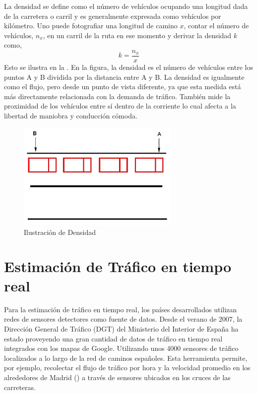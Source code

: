 La densidad se define como el número de vehículos ocupando una longitud dada de la carretera o carril y es generalmente expresada como vehículos por kilómetro. Uno puede fotografiar una longitud de camino $x$, contar el número de vehículos, $n_{x}$, en un carril de la ruta en ese momento y derivar la densidad $k$ como,
\begin{equation}
k=\frac { { n }_{ x } }{ x }
\end{equation}
Esto se ilustra en la . En la figura, la densidad es el número de vehículos entre los puntos A y B dividida por la distancia entre A y B. La densidad es igualmente como el flujo, pero desde un punto de vista diferente, ya que esta medida está más directamente relacionada con la demanda de tráfico. También mide la proximidad de los vehículos entre sí dentro de la corriente lo cual afecta a la libertad de maniobra y conducción cómoda.

\begin{figure}[h]
	\centering
	\includegraphics[width=0.7\textwidth]{capitulos/5/figuras/figura1.jpg}
	\caption{\label{fig:densidad} Ilustración de Densidad}	
\end{figure}

\section{Estimación de Tráfico en tiempo real}

Para la estimación de tráfico en tiempo real, los países desarrollados utilizan redes de sensores detectores \cite{leduc2008road} como fuente de datos. Desde el verano de 2007, la Dirección General de Tráfico (DGT) del Ministerio del Interior de España ha estado proveyendo una gran cantidad de datos de tráfico en tiempo real integrados con los mapas de Google. Utilizando unos 4000 sensores de tráfico localizados a lo largo de la red de caminos españoles. Esta herramienta permite, por ejemplo, recolectar el flujo de tráfico por hora y la velocidad promedio en los alrededores de Madrid () a través de sensores ubicados en los cruces de las carreteras.

